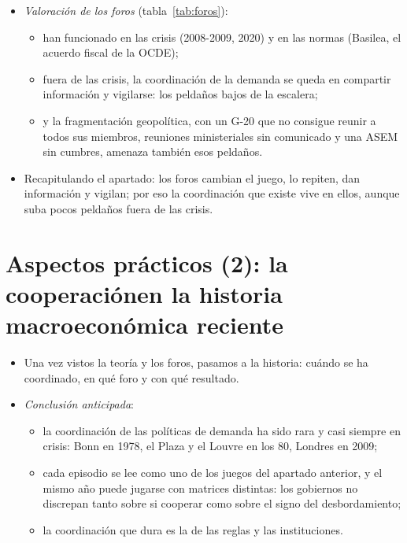 \documentclass[11pt]{article}
\begin{document}
\begin{itemize}
\item \emph{Valoración de los foros} (tabla~\ref{tab:foros}):
  \begin{itemize}
  \item han funcionado en las crisis (2008-2009, 2020) y en las normas (Basilea, el acuerdo fiscal de la OCDE);
  \item fuera de las crisis, la coordinación de la demanda se queda en compartir información y vigilarse: los peldaños bajos de la escalera;
  \item y la fragmentación geopolítica, con un G-20 que no consigue reunir a todos sus miembros, reuniones ministeriales sin comunicado y una ASEM sin cumbres, amenaza también esos peldaños.
  \end{itemize}
\item Recapitulando el apartado: los foros cambian el juego, lo repiten, dan información y vigilan; por eso la coordinación que existe vive en ellos, aunque suba pocos peldaños fuera de las crisis.
\end{itemize}

\section{Aspectos prácticos (2): la cooperación\cortetitulo en la historia macroeconómica reciente}\label{sec:historia}

\begin{itemize}
\item Una vez vistos la teoría y los foros, pasamos a la historia: cuándo se ha coordinado, en qué foro y con qué resultado.
\item \emph{Conclusión anticipada}:
  \begin{itemize}
  \item la coordinación de las políticas de demanda ha sido rara y casi siempre en crisis: Bonn en 1978, el Plaza y el Louvre en los 80, Londres en 2009;
  \item cada episodio se lee como uno de los juegos del apartado anterior, y el mismo año puede jugarse con matrices distintas: los gobiernos no discrepan tanto sobre si cooperar como sobre el signo del desbordamiento;
  \item la coordinación que dura es la de las reglas y las instituciones.
  \end{itemize}
\end{itemize}
\end{document}
